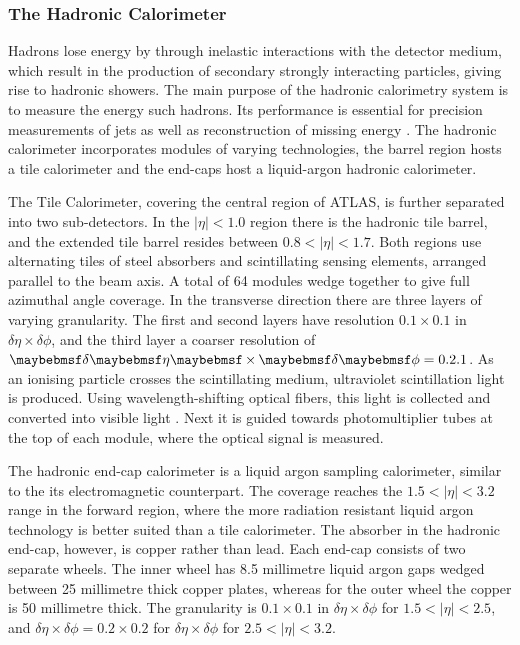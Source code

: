 \subsubsection{The Hadronic Calorimeter}
Hadrons lose energy by through inelastic interactions with the detector medium, which result in the production of secondary strongly interacting particles, giving rise to hadronic showers. The main purpose of the hadronic calorimetry system is to measure the energy such hadrons. Its performance is essential for precision measurements of jets as well as reconstruction of missing energy \cite{Aaboud:2018scw}. The hadronic calorimeter incorporates modules of varying technologies, the barrel region hosts a tile calorimeter and the end-caps host a liquid-argon hadronic calorimeter. 

The Tile Calorimeter, covering the central region of ATLAS, is further separated into two sub-detectors. In the $|\eta| < 1.0$ region there is the hadronic tile barrel, and the extended tile barrel resides between $0.8 < |\eta| < 1.7$. Both regions use alternating tiles of steel absorbers and scintillating sensing elements, arranged parallel to the beam axis. A total of 64 modules wedge together to give full azimuthal angle coverage. In the transverse direction there are three layers of varying granularity. The first and second layers have resolution $0.1 \times 0.1$ in $\delta\eta\times\delta\phi$, and the third layer a coarser resolution of $\delta\eta\times\delta\phi = 0.2 \time 0.1$. As an ionising particle crosses the scintillating medium, ultraviolet scintillation light is produced. Using wavelength-shifting optical fibers, this light is collected and converted into visible light . Next it is guided towards photomultiplier tubes at the top of each module, where the optical signal is measured.

The hadronic end-cap calorimeter is a liquid argon sampling calorimeter, similar to the its electromagnetic counterpart. The coverage reaches the $1.5 < |\eta| < 3.2$ range in the forward region, where the more radiation resistant liquid argon technology is better suited than a tile calorimeter. The absorber in the hadronic end-cap, however, is copper rather than lead. Each end-cap consists of two separate wheels. The inner wheel has 8.5 millimetre liquid argon gaps wedged between 25 millimetre thick copper plates, whereas for the outer wheel the copper is 50 millimetre thick. The granularity is $0.1 \times 0.1$ in $\delta\eta\times\delta\phi$ for $1.5 < |\eta| < 2.5$, and $\delta\eta\times\delta\phi = 0.2 \times 0.2$ for $\delta\eta\times\delta\phi$ for $2.5 < |\eta| < 3.2$.

